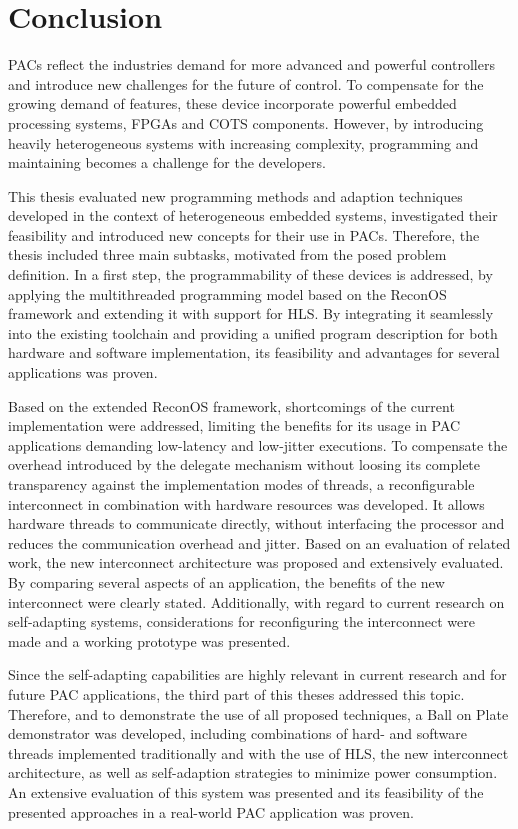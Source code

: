 \chapter{Conclusion}
\label{sec:conclusion}
\aclp{PAC} reflect the industries demand for more advanced and powerful
controllers and introduce new challenges for the future of control. To
compensate for the growing demand of features, these device incorporate
powerful embedded processing systems, \acp{FPGA} and \ac{COTS} components.
However, by introducing heavily heterogeneous systems with increasing
complexity, programming and maintaining becomes a challenge for the
developers.

This thesis evaluated new programming methods and adaption
techniques developed in the context of heterogeneous embedded systems,
investigated their feasibility and introduced new concepts for their use in
\acp{PAC}. Therefore, the thesis included three main subtasks, motivated from
the posed problem definition. In a first step, the programmability of these
devices is addressed, by applying the multithreaded programming model based on
the ReconOS framework and extending it with support for \ac{HLS}. By
integrating it seamlessly into the existing toolchain and providing a unified
program description for both hardware and software implementation, its
feasibility and advantages for several applications was proven.

Based on the extended ReconOS framework, shortcomings of the current
implementation were addressed, limiting the benefits for its usage in
\ac{PAC} applications demanding low-latency and low-jitter executions. To
compensate the overhead introduced by the delegate mechanism without loosing
its complete transparency against the implementation modes of threads, a
reconfigurable interconnect in combination with hardware resources was
developed. It allows hardware threads to communicate directly, without
interfacing the processor and reduces the communication overhead and jitter.
Based on an evaluation of related work, the new interconnect architecture was
proposed and extensively evaluated. By comparing several aspects of an
application, the benefits of the new interconnect were clearly stated.
Additionally, with regard to current research on self-adapting systems,
considerations for reconfiguring the interconnect were made and a working
prototype was presented.

Since the self-adapting capabilities are highly relevant in current research
and for future \ac{PAC} applications, the third part of this theses addressed
this topic. Therefore, and to demonstrate the use of all proposed techniques,
a Ball on Plate demonstrator was developed, including combinations of hard-
and software threads implemented traditionally and with the use of
\ac{HLS}, the new interconnect architecture, as well as self-adaption
strategies to minimize power consumption. An extensive evaluation of this
system was presented and its feasibility of the presented approaches in a
real-world \ac{PAC} application was proven.

